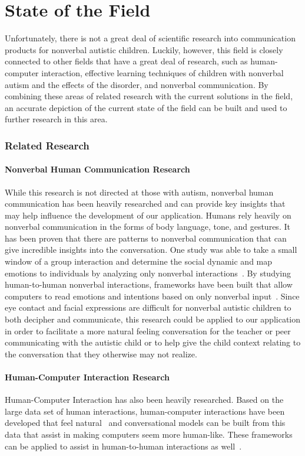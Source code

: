 \chapter{State of the Field}
Unfortunately, there is not a great deal of scientific research into communication products for nonverbal autistic children. Luckily, however, this field is closely connected to other fields that have a great deal of research, such as human-computer interaction, effective learning techniques of children with nonverbal autism and the effects of the disorder, and nonverbal communication.  By combining these areas of related research with the current solutions in the field, an accurate depiction of the current state of the field can be built and used to further research in this area.
\subsection{Related Research}
\subsubsection{Nonverbal Human Communication Research}
While this research is not directed at those with autism, nonverbal human communication has been heavily researched and can provide key insights that may help influence the development of our application. Humans rely heavily on nonverbal communication in the forms of body language, tone, and gestures. It has been proven that there are patterns to nonverbal communication that can give incredible insights into the conversation. One study was able to take a small window of a group interaction and determine the social dynamic and map emotions to individuals by analyzing only nonverbal interactions~\cite{jayagopi}. By studying human-to-human nonverbal interactions, frameworks have been built that allow computers to read emotions and intentions based on only nonverbal input~\cite{sumi}. Since eye contact and facial expressions are difficult for nonverbal autistic children to both decipher and communicate, this research could be applied to our application in order to facilitate a more natural feeling conversation for the teacher or peer communicating with the autistic child or to help give the child context relating to the conversation that they otherwise may not realize.

\subsubsection{Human-Computer Interaction Research}
Human-Computer Interaction has also been heavily researched. Based on the large data set of human interactions, human-computer interactions have been developed that feel natural~\cite{rich} and conversational models can be built from this data that assist in making computers seem more human-like. These frameworks can be applied to assist in human-to-human interactions as well~\cite{sumi}.
